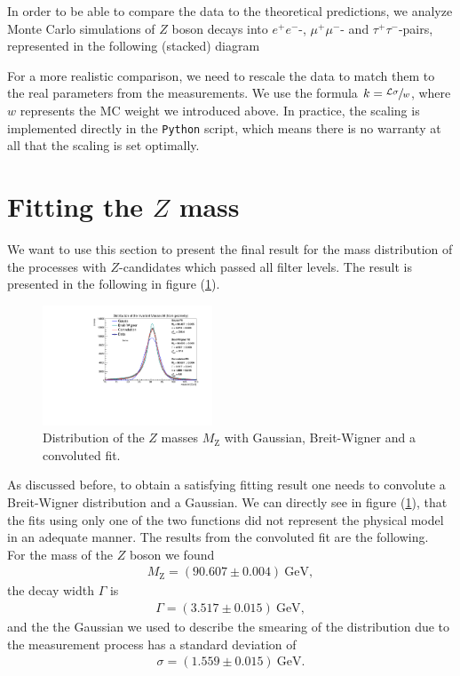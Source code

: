 \documentclass[twocolumn,
			   showpacs,%
               nofootinbib,
               aps,%
               prd,
               notitlepage,
               showkeys,
               10pt]{revtex4-1}
\begin{document}
In order to be able to compare the data to the theoretical predictions, we analyze Monte Carlo simulations of $Z$ boson decays into $e^+e^-$-, $\mu^+\mu^-$- and $\tau^+\tau^-$-pairs, represented in the following (stacked) diagram %


\label{fig:MChisto}

For a more realistic comparison, we need to rescale the data to match them to the real parameters from the measurements. We use the formula $k = \sfrac{\mathcal{L}\sigma}{w}$, where $w$ represents the MC weight we introduced above. In practice, the scaling is implemented directly in the \verb|Python| script, which means there is no warranty at all that the scaling is set optimally. 

\section{Fitting the $Z$ mass}

We want to use this section to present the final result for the mass distribution of the processes with $Z$-candidates which passed all filter levels. The result is presented in the following in figure (\ref{fig:MassDist}).

\begin{figure}[H]
	\centering
	\includegraphics[width = 0.45\textwidth]{figures/plots/ZMassFitted}
	\caption{Distribution of the $Z$ masses $M_{\mathrm{Z}}$ with Gaussian, Breit-Wigner and a convoluted fit.}
	\label{fig:MassDist}
\end{figure}

As discussed before, to obtain a satisfying fitting result one needs to convolute a Breit-Wigner distribution and a Gaussian. We can directly see in figure (\ref{fig:MassDist}), that the fits using only one of the two functions did not represent the physical model in an adequate manner.
The results from the convoluted fit are the following. \\

For the mass of the $Z$ boson we found
\begin{align}
	M_{\mathrm{Z}} = (90.607 \pm 0.004) \ \text{GeV},
\end{align} 
the decay width $\Gamma$ is
\begin{align}
\Gamma = (3.517 \pm 0.015) \ \text{GeV},	
\end{align}
and the the Gaussian we used to describe the smearing of the distribution due to the measurement process has a standard deviation of 
\begin{align}
	\sigma = (1.559 \pm 0.015) \ \text{GeV}.
\end{align}
\end{document}
